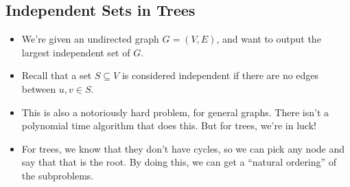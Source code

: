 \subsection{Independent Sets in Trees}
\begin{itemize}
	\item We're given an undirected graph \(G = (V, E)\), and want to output the largest independent 
		set of \(G\).
	\item Recall that a set \(S \subseteq V\) is considered independent if there are no 
		edges between \(u, v \in S\).
	\item This is also a notoriously hard problem, for general graphs. There isn't a polynomial time algorithm 
		that does this. But for trees, we're in luck!


	\item For trees, we know that they don't have cycles, so we can pick any node and say that that is the root.
		By doing this, we can get a ``natural ordering'' of the subproblems. 
\end{itemize}

